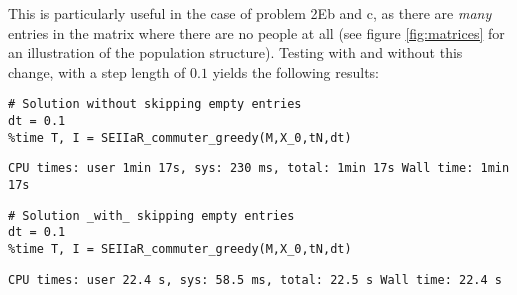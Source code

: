 This is particularly useful in the case of problem 2Eb and c, as there are \textit{many} entries in the matrix where there are no people at all (see figure \ref{fig:matrices} for an illustration of the population structure). Testing with and without this change, with a step length of $0.1$ yields the following results:
\begin{lstlisting}
# Solution without skipping empty entries
dt = 0.1
%time T, I = SEIIaR_commuter_greedy(M,X_0,tN,dt)
\end{lstlisting}
\texttt{\small CPU times: user 1min 17s, sys: 230 ms, total: 1min 17s
Wall time: 1min 17s}
\begin{lstlisting}
# Solution _with_ skipping empty entries
dt = 0.1
%time T, I = SEIIaR_commuter_greedy(M,X_0,tN,dt)
\end{lstlisting}
\texttt{\small CPU times: user 22.4 s, sys: 58.5 ms, total: 22.5 s
Wall time: 22.4 s}


